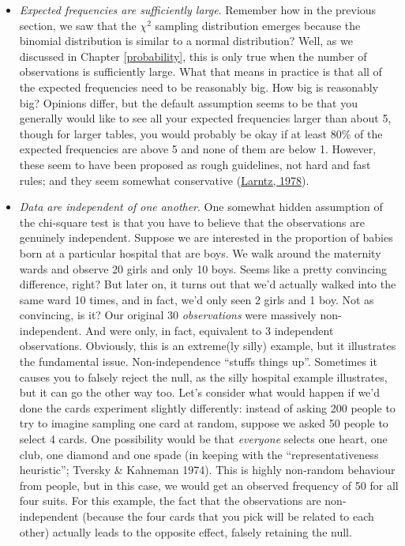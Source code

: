 \documentclass[
]{book}
\providecommand{\tightlist}{%
  \setlength{\itemsep}{0pt}\setlength{\parskip}{0pt}}
\theoremstyle{definition}
\theoremstyle{definition}
\theoremstyle{definition}
\theoremstyle{definition}
\theoremstyle{remark}
\begin{document}
\begin{itemize}
\tightlist
\item
  \emph{Expected frequencies are sufficiently large}. Remember how in the previous section, we saw that the \(\chi^2\) sampling distribution emerges because the binomial distribution is similar to a normal distribution? Well, as we discussed in Chapter \ref{probability}, this is only true when the number of observations is sufficiently large. What that means in practice is that all of the expected frequencies need to be reasonably big. How big is reasonably big? Opinions differ, but the default assumption seems to be that you generally would like to see all your expected frequencies larger than about 5, though for larger tables, you would probably be okay if at least 80\% of the expected frequencies are above 5 and none of them are below 1. However, these seem to have been proposed as rough guidelines, not hard and fast rules; and they seem somewhat conservative (\protect\hyperlink{ref-Larntz1978}{Larntz, 1978}).
\item
  \emph{Data are independent of one another}. One somewhat hidden assumption of the chi-square test is that you have to believe that the observations are genuinely independent. Suppose we are interested in the proportion of babies born at a particular hospital that are boys. We walk around the maternity wards and observe 20 girls and only 10 boys. Seems like a pretty convincing difference, right? But later on, it turns out that we'd actually walked into the same ward 10 times, and in fact, we'd only seen 2 girls and 1 boy. Not as convincing, is it? Our original 30 \emph{observations} were massively non-independent. And were only, in fact, equivalent to 3 independent observations. Obviously, this is an extreme(ly silly) example, but it illustrates the fundamental issue. Non-independence ``stuffs things up''. Sometimes it causes you to falsely reject the null, as the silly hospital example illustrates, but it can go the other way too. Let's consider what would happen if we'd done the cards experiment slightly differently: instead of asking 200 people to try to imagine sampling one card at random, suppose we asked 50 people to select 4 cards. One possibility would be that \emph{everyone} selects one heart, one club, one diamond and one spade (in keeping with the ``representativeness heuristic''; Tversky \& Kahneman 1974). This is highly non-random behaviour from people, but in this case, we would get an observed frequency of 50 for all four suits. For this example, the fact that the observations are non-independent (because the four cards that you pick will be related to each other) actually leads to the opposite effect, falsely retaining the null.
\end{itemize}
\end{document}
